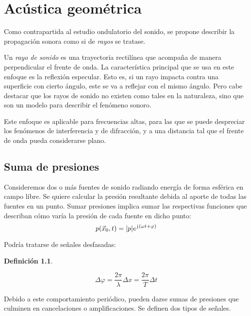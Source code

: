 \documentclass[a5paper,12pt,twoside]{book}
\newtheorem{defn}{{Definición}}[chapter]
\begin{document}
\chapter{Acústica geométrica}

Como contrapartida al estudio ondulatorio del sonido, se propone describir la propagación sonora como si de \emph{rayos} se tratase.

Un \emph{rayo de sonido} es una trayectoria rectilínea que acompaña de manera perpendicular el frente de onda.
La característica principal que se usa en este enfoque es la reflexión especular.
Esto es, si un rayo impacta contra una superficie con cierto ángulo, este se va a reflejar con el mismo ángulo.
Pero cabe destacar que los rayos de sonido no existen como tales en la naturaleza, sino que son un modelo para describir el fenómeno sonoro.

Este enfoque es aplicable para frecuencias altas, para las que se puede despreciar los fenómenos de interferencia y de difracción, y a una distancia tal que el frente de onda pueda considerarse plano.


\section{Suma de presiones}

Consideremos dos o más fuentes de sonido radiando energía de forma esférica en campo libre.
Se quiere calcular la presión resultante debida al aporte de todas las fuentes en un punto.
Sumar presiones implica sumar las respectivas funciones que describan cómo varía la presión de cada fuente en dicho punto:
\begin{equation*}
    p(\Vec{x}_0,t) = {\left| {p} \right|} e^{\mkern2mu\mathrm{j}\mkern1mu(\omega t + \varphi)}
\end{equation*}

Podría tratarse de señales desfasadas:

\begin{mdframed}[style=DefinitionFrame]
    \begin{defn}
    \end{defn}
    \begin{equation*}
        \Delta \varphi = \frac{2\pi}{\lambda} \Delta x = \frac{2\pi}{T} \Delta t
    \end{equation*}
\end{mdframed}

Debido a este comportamiento periódico, pueden darse sumas de presiones que culminen en cancelaciones o amplificaciones.
Se definen dos tipos de señales.
\end{document}

